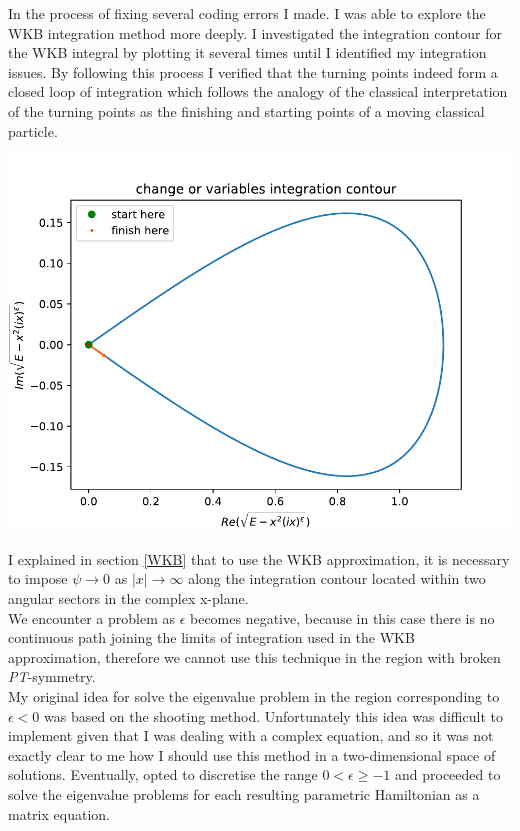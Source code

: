 \documentclass[10pt, a4paper, singlespacing]{report}
\newenvironment{Figure}
    {\par\medskip\noindent\minipage{\linewidth}}
    {\endminipage\par\medskip}
\newcommand\PT{\emph{PT}}
\begin{document}
In the process of fixing several coding errors I made. I was able to explore the WKB integration method more deeply. I investigated the integration contour for the WKB integral by plotting it several times until I identified my integration issues. By following this process I verified that the turning points indeed form a closed loop of integration which follows the analogy of the classical interpretation of the turning points as the finishing and starting points of a moving classical particle.
\begin{Figure}
 \centering
 \includegraphics[width=0.75\linewidth]{integration_contour.pdf}
\end{Figure}
I explained in section \ref{WKB} that to use the WKB approximation, it is necessary to impose $\psi \rightarrow 0$ as $|x| \rightarrow \infty$ along the integration contour located within two angular sectors in the complex x-plane.\\ We encounter a problem as $\epsilon$ becomes negative, because in this case there is no continuous path joining the limits of integration used in the WKB approximation, therefore we cannot use this technique in the region with broken \PT-symmetry.\\
My original idea for solve the eigenvalue problem in the region corresponding to $\epsilon < 0$ was based on the shooting method\cite{N_R}. Unfortunately this idea was difficult to implement given that I was dealing with a complex equation, and so it was not exactly clear to me how I should use this method in a two-dimensional space of solutions. Eventually, opted to discretise the range $0 < \epsilon \geq -1$ and proceeded to solve the eigenvalue problems for each resulting parametric Hamiltonian as a matrix equation.\\
\end{document}
